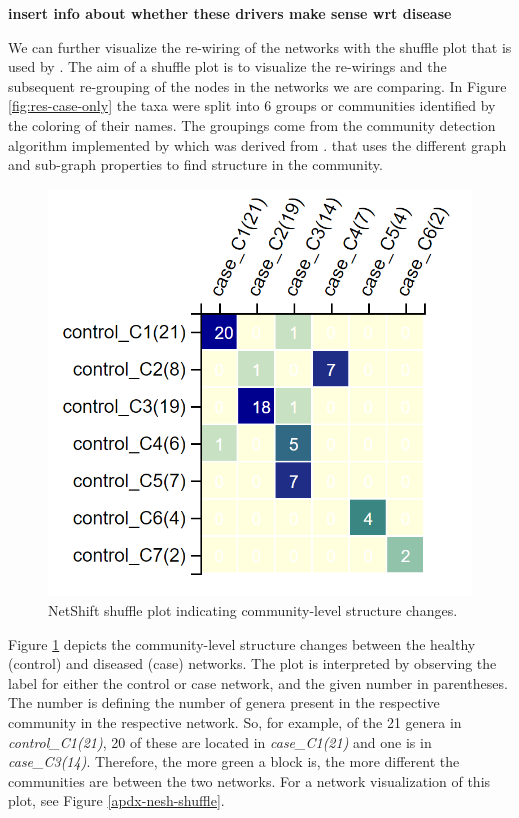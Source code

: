 \textbf{insert info about whether these drivers make sense wrt disease}

We can further visualize the re-wiring of the networks with the shuffle plot that is used by \citeauthor{Kuntal2018}. The aim of a shuffle plot is to visualize the re-wirings and the subsequent re-grouping of the nodes in the networks we are comparing. In Figure \ref{fig:res-case-only} the taxa were split into 6 groups or communities identified by the coloring of their names. The groupings come from the community detection algorithm implemented by \citeauthor{Kuntal2018} which was derived from \citet{Yang2016}. that uses the different graph and sub-graph properties to find structure in the community.
\begin{figure}[!thbp]
    \centering
    \includegraphics[width=0.8\linewidth]{figure/results/shuffle_plot.png}
    \caption[NetShift shuffle plot indicating community-level structure changes.]{NetShift shuffle plot indicating community-level structure changes. }
    \label{fig:res-shuffle}
\end{figure}
Figure \ref{fig:res-shuffle} depicts the community-level structure changes between the healthy (control) and diseased (case) networks. The plot is interpreted by observing the label for either the control or case network, and the given number in parentheses. The number is defining the number of genera present in the respective community in the respective network. So, for example, of the 21 genera in \textit{control\_C1(21)}, 20 of these are located in \textit{case\_C1(21)} and one is in \textit{case\_C3(14)}. Therefore, the more green a block is, the more different the communities are between the two networks. For a network visualization of this plot, see Figure \ref{apdx-nesh-shuffle}.

